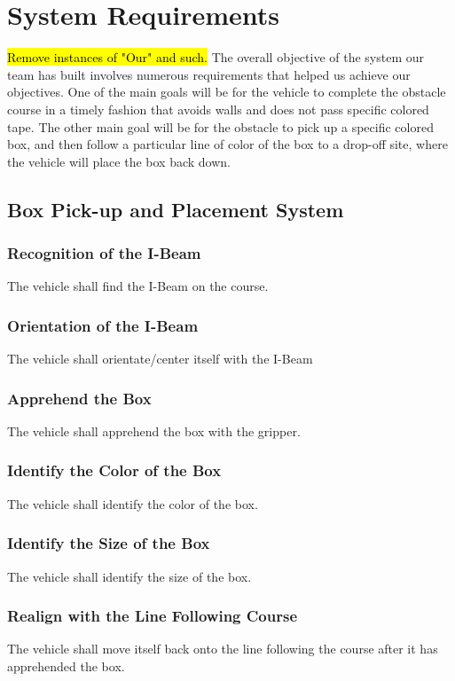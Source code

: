 \documentclass[11pt]{report}
\begin{document}
\chapter{System Requirements}\label{ch:system-requirements}

\hl{Remove instances of "Our" and such.}
The overall objective of the system our team has built involves numerous requirements that helped us achieve our objectives. One of the main goals will be for the vehicle to complete the obstacle course in a timely fashion that avoids walls and does not pass specific colored tape. The other main goal will be for the obstacle to pick up a specific colored box, and then follow a particular line of color of the box to a drop-off site, where the vehicle will place the box back down.

\section{Box Pick-up and Placement System}

\subsection{Recognition of the I-Beam}
The vehicle shall find the I-Beam on the course.

\subsection{Orientation of the I-Beam}
The vehicle shall orientate/center itself with the I-Beam

\subsection{Apprehend the Box}
The vehicle shall apprehend the box with the gripper.

\subsection{Identify the Color of the Box}
The vehicle shall identify the color of the box.

\subsection{Identify the Size of the Box}
The vehicle shall identify the size of the box. 

\subsection{Realign with the Line Following Course}
The vehicle shall move itself back onto the line following the course after it has apprehended the box.
\end{document}
